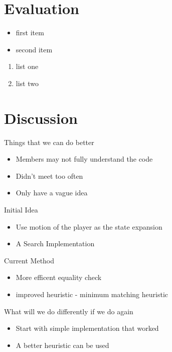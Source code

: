 \documentclass{beamer}
\begin{document}
\section{Evaluation}
\begin{frame}
  \begin{itemize}
  \item first item
  \item second item
  \end{itemize}
  \begin{enumerate}
  \item list one
  \item list two
  \end{enumerate}
\end{frame}

\section{Discussion}
\begin{frame}
Things that we can do better
  \begin{itemize}
  \item Members may not fully understand the code
  \item Didn't meet too often
  \item Only have a vague idea
 
  \end{itemize}
\end{frame}

\begin{frame}
Initial Idea
  \begin{itemize}
  \item Use motion of the player as the state expansion
  \item A\* Search Implementation
  \end{itemize}
\end{frame}

\begin{frame}
Current Method
  \begin{itemize}
  \item More efficent equality check
  \item improved heuristic - minimum matching heuristic
  \end{itemize}
\end{frame}

\begin{frame}
What will we  do differently if we do again
  \begin{itemize}
  \item Start with simple implementation that worked
  \item A better heuristic can be used
  \end{itemize}
\end{frame}
\end{document}
